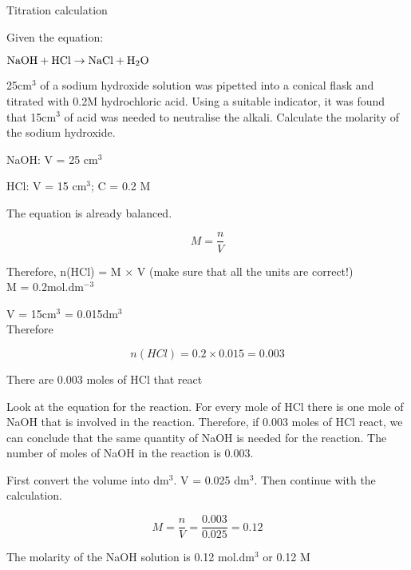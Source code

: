 \begin{wex}{Titration calculation\\}{
Given the equation:
\begin{center}
$\rm{NaOH + HCl \rightarrow NaCl + H_{2}O}$
\end{center}

25cm$^{3}$ of a sodium hydroxide solution was pipetted into a conical flask and titrated with 0.2M hydrochloric acid. Using a suitable indicator, it was found that 15cm$^{3}$ of acid was needed to neutralise the alkali. Calculate the molarity of the sodium hydroxide.\\
}

{

NaOH: V = 25 cm$^{3}$

HCl: V = 15 cm$^{3}$; C = 0.2 M

The equation is already balanced.\\

\begin{equation*}
M = \frac{n}{V}
\end{equation*}

Therefore, n(HCl) = M $\times$ V (make sure that all the units are correct!)\\

M = 0.2mol.dm$^{-3}$ 

V = 15cm$^{3}$ = 0.015dm$^{3}$ \\

Therefore

\begin{equation*}
n(HCl) = 0.2 \times 0.015 = 0.003
\end{equation*}

There are 0.003 moles of HCl that react\\

Look at the equation for the reaction. For every mole of HCl there is one mole of NaOH that is involved in the reaction. Therefore, if 0.003 moles of HCl react, we can conclude that the same quantity of NaOH is needed for the reaction. The number of moles of NaOH in the reaction is 0.003.\\

First convert the volume into dm$^{3}$. V = 0.025 dm$^{3}$. Then continue with the calculation.

\begin{equation*}
M = \frac{n}{V} = \frac{0.003}{0.025} = 0.12
\end{equation*}

The molarity of the NaOH solution is 0.12 mol.dm$^{3}$ or 0.12 M
}
\end{wex}

